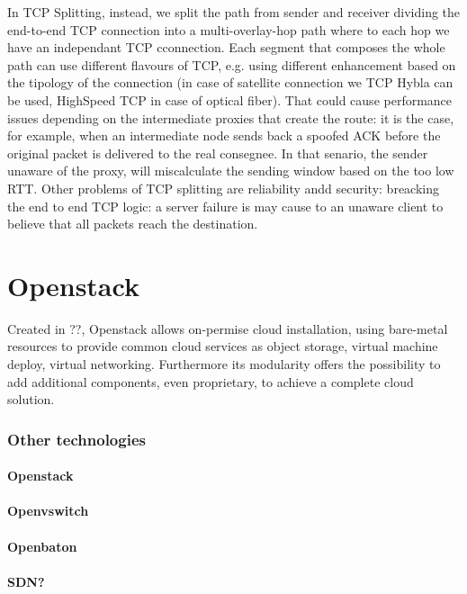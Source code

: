\documentclass[10pt]{book}
\begin{document}
In TCP Splitting, instead, we split the path from sender and receiver dividing
the end-to-end TCP connection into a multi-overlay-hop path where to each hop
we have an independant TCP cconnection. Each segment that composes the whole
path can use different flavours of TCP, e.g. using different enhancement based
on the tipology of the connection (in case of satellite connection we TCP Hybla
can be used, HighSpeed TCP in case of optical fiber). That could cause
performance issues depending on the intermediate proxies that create the route:
it is the case, for example, when an intermediate node sends back a spoofed ACK
before the original packet is delivered to the real consegnee. In that senario,
the sender unaware of the proxy, will miscalculate the sending window based on
the too low RTT. Other problems of TCP splitting are reliability andd security:
breacking the end to end TCP logic: a server failure is may cause to an unaware
client to believe that all packets reach the destination.


\section{Openstack}
\label{chap:prjan:sec:openstack}
Created in ??, 
Openstack allows on-permise cloud installation, using bare-metal resources to 
provide common cloud services as object storage, virtual machine deploy, 
virtual networking. Furthermore its modularity offers the possibility to add 
additional components, even proprietary, to achieve a complete cloud solution.






\subsubsection{Other technologies}
\paragraph{Openstack}
\paragraph{Openvswitch}
\paragraph{Openbaton}
\paragraph{SDN?}
\end{document}
